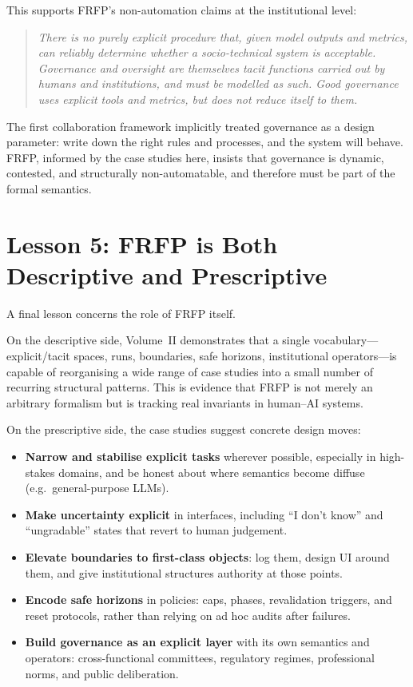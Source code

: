This supports FRFP’s non-automation claims at the institutional level:

\begin{quote}
  \emph{There is no purely explicit procedure that, given model outputs and metrics, can reliably determine whether a socio-technical system is acceptable.
  Governance and oversight are themselves tacit functions carried out by humans and institutions, and must be modelled as such.
  Good governance uses explicit tools and metrics, but does not reduce itself to them.}
\end{quote}

The first collaboration framework implicitly treated governance as a design parameter: write down the right rules and processes, and the system will behave.
FRFP, informed by the case studies here, insists that governance is dynamic, contested, and structurally non-automatable, and therefore must be part of the formal semantics.

\section*{Lesson 5: FRFP is Both Descriptive and Prescriptive}

A final lesson concerns the role of FRFP itself.

On the descriptive side, Volume~II demonstrates that a single vocabulary---explicit/tacit spaces, runs, boundaries, safe horizons, institutional operators---is capable of reorganising a wide range of case studies into a small number of recurring structural patterns.
This is evidence that FRFP is not merely an arbitrary formalism but is tracking real invariants in human--AI systems.

On the prescriptive side, the case studies suggest concrete design moves:

\begin{itemize}
  \item \textbf{Narrow and stabilise explicit tasks} wherever possible, especially in high-stakes domains, and be honest about where semantics become diffuse (e.g.\ general-purpose LLMs).
  \item \textbf{Make uncertainty explicit} in interfaces, including ``I don't know'' and ``ungradable'' states that revert to human judgement.
  \item \textbf{Elevate boundaries to first-class objects}:
        log them, design UI around them, and give institutional structures authority at those points.
  \item \textbf{Encode safe horizons} in policies:
        caps, phases, revalidation triggers, and reset protocols, rather than relying on ad hoc audits after failures.
  \item \textbf{Build governance as an explicit layer} with its own semantics and operators:
        cross-functional committees, regulatory regimes, professional norms, and public deliberation.
\end{itemize}

